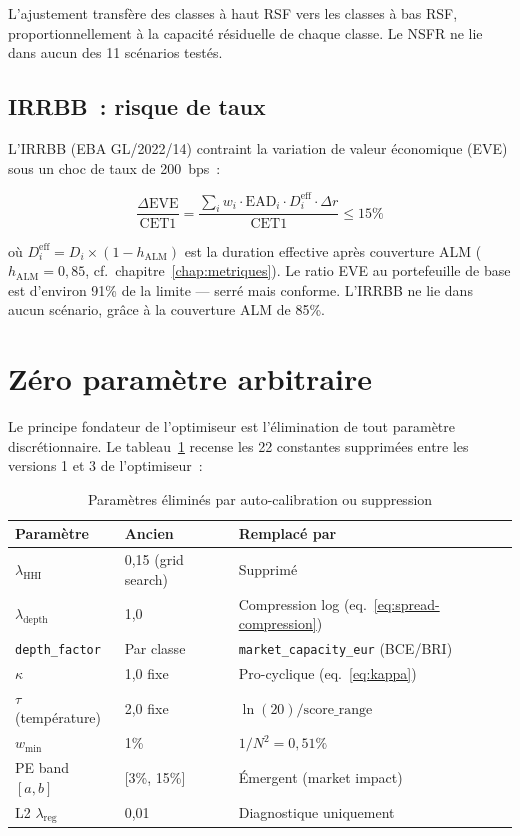 \documentclass[12pt, a4paper, twoside, openright]{report}
\theoremstyle{definition}
\begin{document}
L'ajustement transfère des classes à haut RSF vers les classes à bas RSF, proportionnellement à la capacité résiduelle de chaque classe. Le NSFR ne lie dans aucun des 11 scénarios testés.

\subsection{IRRBB~: risque de taux}
\label{sec:irrbb}

L'IRRBB (EBA GL/2022/14) contraint la variation de valeur économique (EVE) sous un choc de taux de 200~bps~:

\begin{equation}
\frac{\Delta \text{EVE}}{\text{CET1}} = \frac{\sum_i w_i \cdot \text{EAD}_i \cdot D_i^{\text{eff}} \cdot \Delta r}{\text{CET1}} \leq 15\%
\label{eq:irrbb}
\end{equation}

\noindent où $D_i^{\text{eff}} = D_i \times (1 - h_{\text{ALM}})$ est la duration effective après couverture ALM ($h_{\text{ALM}} = 0{,}85$, cf.\ chapitre~\ref{chap:metriques}). Le ratio EVE au portefeuille de base est d'environ 91\% de la limite --- serré mais conforme. L'IRRBB ne lie dans aucun scénario, grâce à la couverture ALM de 85\%.


\section{Zéro paramètre arbitraire}
\label{sec:blcvar-zero-params}

Le principe fondateur de l'optimiseur est l'élimination de tout paramètre discrétionnaire. Le tableau~\ref{tab:zero-params} recense les 22 constantes supprimées entre les versions 1 et 3 de l'optimiseur~:

\begin{table}[htbp]
\centering
\small
\caption{Paramètres éliminés par auto-calibration ou suppression}
\label{tab:zero-params}
\begin{tabular}{lll}
\toprule
\textbf{Paramètre} & \textbf{Ancien} & \textbf{Remplacé par} \\
\midrule
$\lambda_{\text{HHI}}$ & 0,15 (grid search) & Supprimé \\
$\lambda_{\text{depth}}$ & 1,0 & Compression log (eq.~\ref{eq:spread-compression}) \\
\texttt{depth\_factor} & Par classe & \texttt{market\_capacity\_eur} (BCE/BRI) \\
$\kappa$ & 1,0 fixe & Pro-cyclique (eq.~\ref{eq:kappa}) \\
$\tau$ (température) & 2,0 fixe & $\ln(20)/\text{score\_range}$ \\
$w_{\min}$ & 1\% & $1/N^2 = 0{,}51\%$ \\
PE band $[a, b]$ & [3\%, 15\%] & Émergent (market impact) \\
L2 $\lambda_{\text{reg}}$ & 0,01 & Diagnostique uniquement \\
\bottomrule
\end{tabular}
\end{table}
\end{document}
